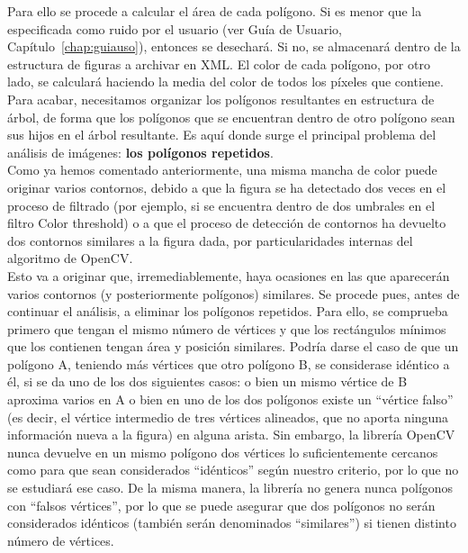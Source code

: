 {	Para ello se procede a calcular el área de cada polígono. Si es menor que la especificada como ruido por el usuario (ver Guía de Usuario, Capítulo~\ref{chap:guiauso}), entonces se desechará. Si no, se almacenará dentro de la estructura de figuras a archivar en XML. El color de cada polígono, por otro lado, se calculará haciendo la media del color de todos los píxeles que contiene.\\
	
	Para acabar, necesitamos organizar los polígonos resultantes en estructura de árbol, de forma que los polígonos que se encuentran dentro de otro polígono sean sus hijos en el árbol resultante. Es aquí donde surge el principal problema del análisis de imágenes: \textbf{los polígonos repetidos}.\\
	
	Como ya hemos comentado anteriormente, una misma mancha de color puede originar varios contornos, debido a que la figura se ha detectado dos veces en el proceso de filtrado (por ejemplo, si se encuentra dentro de dos umbrales en el filtro Color threshold) o a que el proceso de detección de contornos ha devuelto dos contornos similares a la figura dada, por particularidades internas del algoritmo de OpenCV.\\
	
	Esto va a originar que, irremediablemente, haya ocasiones en las que aparecerán varios contornos (y posteriormente polígonos) similares. Se procede pues, antes de continuar el análisis, a eliminar los polígonos repetidos. Para ello, se comprueba primero que tengan el mismo número de vértices y que los rectángulos mínimos que los contienen tengan área y posición similares. Podría darse el caso de que un polígono A, teniendo más vértices que otro polígono B, se considerase idéntico a él, si se da uno de los dos siguientes casos: o bien un mismo vértice de B aproxima varios en A o bien en uno de los dos polígonos existe un ``vértice falso'' (es decir, el vértice intermedio de tres vértices alineados, que no aporta ninguna información nueva a la figura) en alguna arista. Sin embargo, la librería OpenCV nunca devuelve en un mismo polígono dos vértices lo suficientemente cercanos como para que sean considerados ``idénticos'' según nuestro criterio, por lo que no se estudiará ese caso. De la misma manera, la librería no genera nunca polígonos con ``falsos vértices'', por lo que se puede asegurar que dos polígonos no serán considerados idénticos (también serán denominados ``similares'') si tienen distinto número de vértices.\\

}
